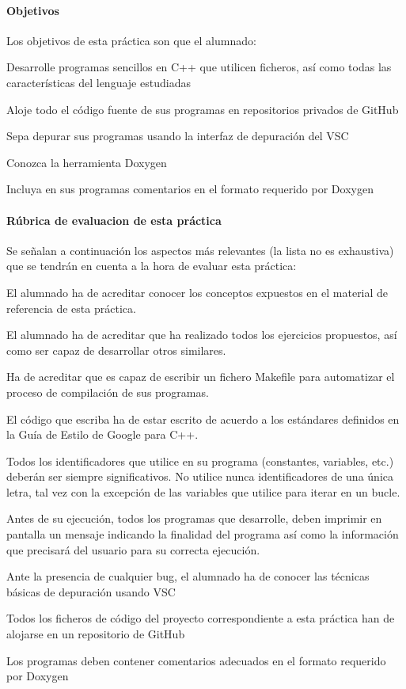 \paragraph*{Objetivos}

Los objetivos de esta práctica son que el alumnado\+:
\begin{DoxyItemize}
\item Desarrolle programas sencillos en C++ que utilicen ficheros, así como todas las características del lenguaje estudiadas
\item Aloje todo el código fuente de sus programas en repositorios privados de Git\+Hub
\item Sepa depurar sus programas usando la interfaz de depuración del V\+SC
\item Conozca la herramienta Doxygen
\item Incluya en sus programas comentarios en el formato requerido por Doxygen
\end{DoxyItemize}

\paragraph*{Rúbrica de evaluacion de esta práctica}

Se señalan a continuación los aspectos más relevantes (la lista no es exhaustiva) que se tendrán en cuenta a la hora de evaluar esta práctica\+:
\begin{DoxyItemize}
\item El alumnado ha de acreditar conocer los conceptos expuestos en el material de referencia de esta práctica.
\item El alumnado ha de acreditar que ha realizado todos los ejercicios propuestos, así como ser capaz de desarrollar otros similares.
\item Ha de acreditar que es capaz de escribir un fichero Makefile para automatizar el proceso de compilación de sus programas.
\item El código que escriba ha de estar escrito de acuerdo a los estándares definidos en la Guía de Estilo de Google para C++.
\item Todos los identificadores que utilice en su programa (constantes, variables, etc.) deberán ser siempre significativos. No utilice nunca identificadores de una única letra, tal vez con la excepción de las variables que utilice para iterar en un bucle.
\item Antes de su ejecución, todos los programas que desarrolle, deben imprimir en pantalla un mensaje indicando la finalidad del programa así como la información que precisará del usuario para su correcta ejecución.
\item Ante la presencia de cualquier bug, el alumnado ha de conocer las técnicas básicas de depuración usando V\+SC
\item Todos los ficheros de código del proyecto correspondiente a esta práctica han de alojarse en un repositorio de Git\+Hub
\item Los programas deben contener comentarios adecuados en el formato requerido por Doxygen
\end{DoxyItemize}

